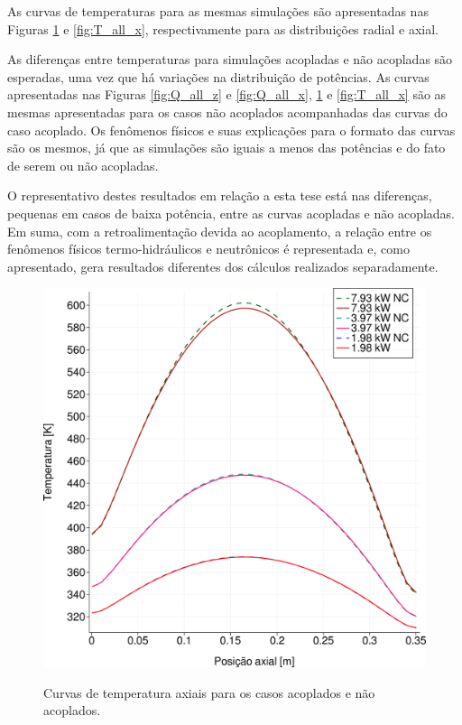 As curvas de temperaturas para as mesmas simulações são apresentadas nas
Figuras \ref{fig:T_all_z} e \ref{fig:T_all_x}, respectivamente para as
distribuições radial e axial.

As diferenças entre temperaturas para simulações acopladas e não acopladas são
esperadas, uma vez que há variações na distribuição  de potências. As curvas apresentadas nas Figuras
\ref{fig:Q_all_z} e \ref{fig:Q_all_x}, \ref{fig:T_all_z} e \ref{fig:T_all_x} são
as mesmas apresentadas para os casos não acoplados acompanhadas das curvas do
caso acoplado. Os fenômenos físicos e suas explicações para o formato das curvas
são os mesmos, já que as simulações são iguais a menos das potências e do fato
de serem ou não acopladas.

O representativo destes resultados em relação a esta tese está nas diferenças,
pequenas em casos de baixa potência, entre as curvas acopladas e não acopladas.
Em suma, com a retroalimentação devida ao acoplamento, a relação entre os fenômenos
físicos termo-hidráulicos e neutrônicos é representada e, como apresentado,
gera resultados diferentes dos cálculos realizados separadamente.

\begin{figure}[htb]
  \caption{Curvas de temperatura axiais para os casos acoplados e não acoplados.}
  \centering\includegraphics[scale=0.5]{figuras/T_z_all_square_port.png}
  \label{fig:T_all_z}
\end{figure}

